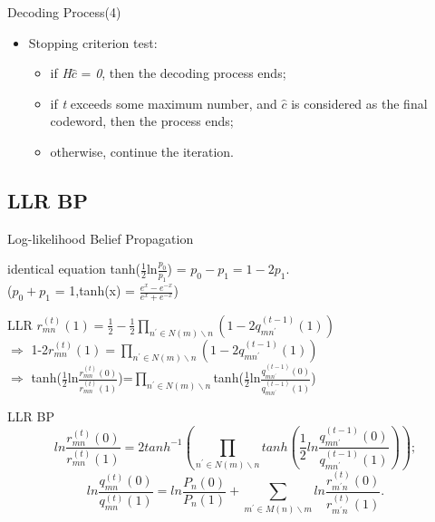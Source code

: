 \documentclass{beamer}
\newcommand{\xieti}{\textsl}
\begin{document}
\begin{frame}
    \begin{block}{Decoding Process(4)}
        \begin{itemize}
        \item Stopping criterion test:
            \begin{itemize}
            \item if \xieti{H}$\hat{c}$ = \xieti{0}, then the decoding process ends;
            \item if \xieti{t} exceeds some maximum number, and $\hat{c}$ is considered as the final codeword, then the process ends;
            \item otherwise, continue the iteration.
            \end{itemize}
        \end{itemize}
    \end{block}
\end{frame}

\subsection{LLR BP}

\begin{frame}{Log-likelihood Belief Propagation}
    \begin{block}{identical equation}
        tanh($\frac{1}{2}$ln$\frac{p_0}{p_1}$) = $p_0-p_1=1-2p_1$.
        \\($p_0+p_1$ = 1,tanh(x) = $\frac{e^x-e^{-x}}{e^x+e^{-x}}$)
    \end{block}
    \begin{block}{LLR}
            $r_{mn}^{(t)}(1)=\frac{1}{2}-\frac{1}{2}\prod_{n^\prime\in N(m)\backslash n}(1-2q_{mn^\prime}^{(t-1)}(1))$\\
            $\Rightarrow$ 1-2$r_{mn}^{(t)}(1)=\prod_{n^\prime\in N(m)\backslash n}(1-2q_{mn^\prime}^{(t-1)}(1))$\\
            $\Rightarrow $ tanh($\frac{1}{2}$ln$\frac{r_{mn}^{(t)}(0)}{r_{mn}^{(t)}(1)}$)=$\prod_{n^\prime\in N(m)\backslash n}$tanh($\frac{1}{2}$ln$\frac{q_{mn^\prime}^{(t-1)}(0)}{q_{mn^\prime}^{(t-1)}(1)}$)
    \end{block}
\end{frame}
\begin{frame}
    \begin{block}{LLR BP}
        \begin{equation}
        ln\frac{r_{mn}^{(t)}(0)}{r_{mn}^{(t)}(1)}=2tanh^{-1}(\prod_{n^\prime\in N(m)\backslash
        n}tanh(\frac{1}{2}ln\frac{q_{mn^\prime}^{(t-1)}(0)}{q_{mn^\prime}^{(t-1)}(1)}));
        \end{equation}
        \begin{equation}
        ln\frac{q_{mn}^{(t)}(0)}{q_{mn}^{(t)}(1)}=ln\frac{P_n(0)}{P_n(1)}+\sum_{m^\prime\in M(n)\backslash
        m}ln\frac{r_{m^\prime n}^{(t)}(0)}{r_{m^\prime n}^{(t)}(1)}.
        \end{equation}
    \end{block}
\end{frame}
\end{document}
